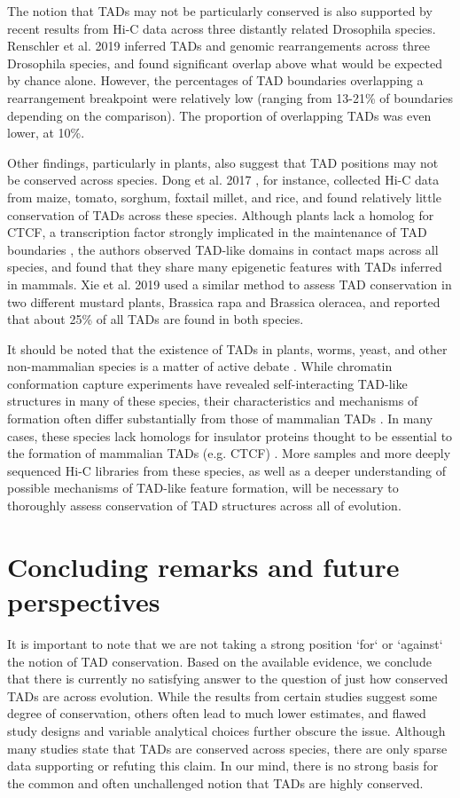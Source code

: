 The notion that TADs may not be particularly conserved is also supported by recent results from Hi-C data across three distantly related Drosophila species. Renschler et al. 2019 \cite{Renschler.2019} inferred TADs and genomic rearrangements across three Drosophila species, and found significant overlap above what would be expected by chance alone. However, the percentages of TAD boundaries overlapping a rearrangement breakpoint were relatively low (ranging from 13-21\% of boundaries depending on the comparison). The proportion of overlapping TADs was even lower, at 10\%.
 
Other findings, particularly in plants, also suggest that TAD positions may not be conserved across species. Dong et al. 2017 \cite{Dong.2017}, for instance, collected Hi-C data from maize, tomato, sorghum, foxtail millet, and rice, and found relatively little conservation of TADs across these species. Although plants lack a homolog for CTCF, a transcription factor strongly implicated in the maintenance of TAD boundaries \cite{Guo.2015, Rudan.2015, Kentepozidou.2020, Gómez-Marín.2015}, the authors observed TAD-like domains in contact maps across all species, and found that they share many epigenetic features with TADs inferred in mammals. Xie et al. 2019 \cite{Xie.2019} used a similar method to assess TAD conservation in two different mustard plants, Brassica rapa and Brassica oleracea, and reported that about 25\% of all TADs are found in both species.

It should be noted that the existence of TADs in plants, worms, yeast, and other non-mammalian species is a matter of active debate \cite{Bonev.2016}. While chromatin conformation capture experiments have revealed self-interacting TAD-like structures in many of these species, their characteristics and mechanisms of formation often differ substantially from those of mammalian TADs \cite{Szabo.2019, Acemel.2017}. In many cases, these species lack homologs for insulator proteins thought to be essential to the formation of mammalian TADs (e.g. CTCF) \cite{Szabo.2019}. More samples and more deeply sequenced Hi-C libraries from these species, as well as a deeper understanding of possible mechanisms of TAD-like feature formation, will be necessary to thoroughly assess conservation of TAD structures across all of evolution.

\section{Concluding remarks and future perspectives}
It is important to note that we are not taking a strong position `for` or `against` the notion of TAD conservation. Based on the available evidence, we conclude that there is currently no satisfying answer to the question of just how conserved TADs are across evolution. While the results from certain studies suggest some degree of conservation, others often lead to much lower estimates, and flawed study designs and variable analytical choices further obscure the issue. Although many studies state that TADs are conserved across species, there are only sparse data supporting or refuting this claim. In our mind, there is no strong basis for the common and often unchallenged notion that TADs are highly conserved. 


